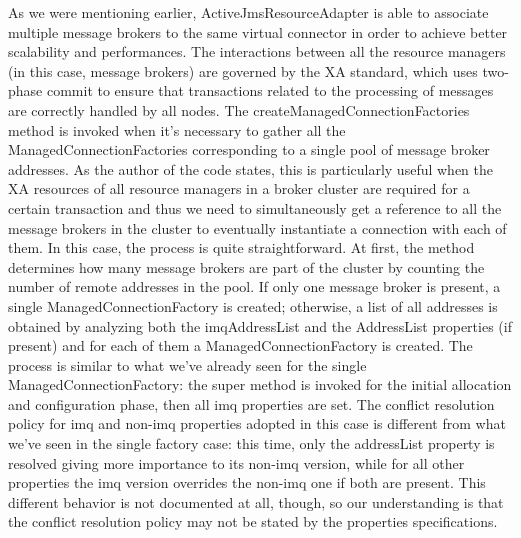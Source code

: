 As we were mentioning earlier, ActiveJmsResourceAdapter is able to associate multiple message brokers to the same virtual connector in order to achieve better scalability and performances. The interactions between all the resource managers (in this case, message brokers) are governed by the XA standard, which uses two-phase commit to ensure that transactions related to the processing of messages are correctly handled by all nodes. 
The createManagedConnectionFactories method is invoked when it's necessary to gather all the ManagedConnectionFactories corresponding to a single pool of message broker addresses. 
As the author of the code states, this is particularly useful when the XA resources of all resource managers in a broker cluster are required for a certain transaction and thus we need to simultaneously get a reference to all the message brokers in the cluster to eventually instantiate a connection with each of them. In this case, the process is quite straightforward.
At first, the method determines how many message brokers are part of the cluster by counting the number of remote addresses in the pool. If only one message broker is present, a single ManagedConnectionFactory is created; otherwise, a list of all addresses is obtained by analyzing both the imqAddressList and the AddressList properties (if present) and for each of them a ManagedConnectionFactory is created. The process is similar to what we've already seen for the single ManagedConnectionFactory: the super method is invoked for the initial allocation and configuration phase, then all imq properties are set. The conflict resolution policy for imq and non-imq properties adopted in this case is different from what we've seen in the single factory case: this time, only the addressList property is resolved giving more importance to its non-imq version, while for all other properties the imq version overrides the non-imq one if both are present. 
This different behavior is not documented at all, though, so our understanding is that the conflict resolution policy may not be stated by the properties specifications.